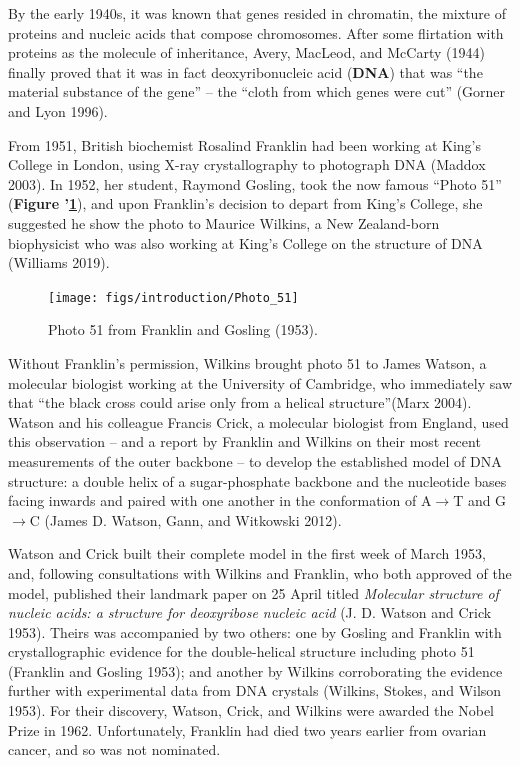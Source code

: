 \documentclass[
]{book}
\begin{document}
By the early 1940s, it was known that genes resided in chromatin, the mixture of proteins and nucleic acids that compose chromosomes. After some flirtation with proteins as the molecule of inheritance, Avery, MacLeod, and McCarty (1944) finally proved that it was in fact deoxyribonucleic acid (\textbf{DNA}) that was ``the material substance of the gene'' -- the ``cloth from which genes were cut'' (Gorner and Lyon 1996).

From 1951, British biochemist Rosalind Franklin had been working at King's College in London, using X-ray crystallography to photograph DNA (Maddox 2003). In 1952, her student, Raymond Gosling, took the now famous ``Photo 51'' (\textbf{Figure '\ref{fig:photo51}}), and upon Franklin's decision to depart from King's College, she suggested he show the photo to Maurice Wilkins, a New Zealand-born biophysicist who was also working at King's College on the structure of DNA (Williams 2019).



\begin{figure}

{\centering \texttt{[image: figs/introduction/Photo\_51]} 

}

\caption{Photo 51 from Franklin and Gosling (1953).}\label{fig:photo51}
\end{figure}

Without Franklin's permission, Wilkins brought photo 51 to James Watson, a molecular biologist working at the University of Cambridge, who immediately saw that ``the black cross could arise only from a helical structure''(Marx 2004). Watson and his colleague Francis Crick, a molecular biologist from England, used this observation -- and a report by Franklin and Wilkins on their most recent measurements of the outer backbone -- to develop the established model of DNA structure: a double helix of a sugar-phosphate backbone and the nucleotide bases facing inwards and paired with one another in the conformation of A\(\rightarrow\)T and G\(\rightarrow\)C (James D. Watson, Gann, and Witkowski 2012).

Watson and Crick built their complete model in the first week of March 1953, and, following consultations with Wilkins and Franklin, who both approved of the model, published their landmark paper on 25 April titled \emph{Molecular structure of nucleic acids: a structure for deoxyribose nucleic acid} (J. D. Watson and Crick 1953). Theirs was accompanied by two others: one by Gosling and Franklin with crystallographic evidence for the double-helical structure including photo 51 (Franklin and Gosling 1953); and another by Wilkins corroborating the evidence further with experimental data from DNA crystals (Wilkins, Stokes, and Wilson 1953). For their discovery, Watson, Crick, and Wilkins were awarded the Nobel Prize in 1962. Unfortunately, Franklin had died two years earlier from ovarian cancer, and so was not nominated.
\end{document}
